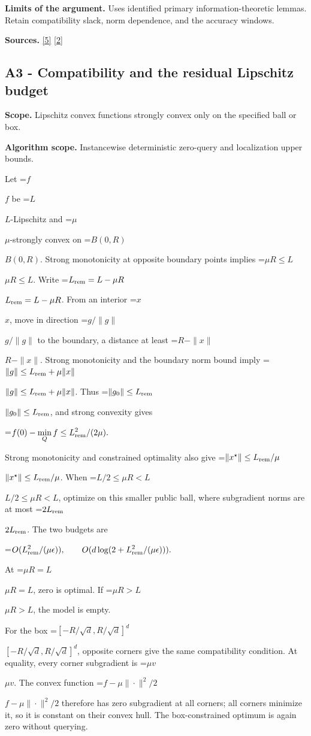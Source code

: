 \documentclass[10pt,a4paper]{article}
\newcommand{\AtlasMath}[1]{\par\begingroup\centering\setbox0=\hbox{$\displaystyle #1$}\ifdim\wd0>1.4\linewidth\typeout{ATLAS WIDE FORMULA: \the\wd0}\fi\ifdim\wd0>\linewidth\resizebox{\linewidth}{!}{\box0}\else\box0\fi\par\endgroup}
\newcommand{\AtlasInlineMath}[1]{\begingroup\setbox0=\hbox{$#1$}\ifdim\wd0>.4\linewidth\endgroup\AtlasMath{#1}\else\endgroup$#1$\fi}
\begin{document}
\textbf{Limits of the argument.} Uses identified primary information-theoretic lemmas. Retain compatibility slack, norm dependence, and the accuracy windows.

\textbf{Sources.} \href{https://arxiv.org/pdf/1407.5144}{[5]} \href{https://arxiv.org/pdf/1401.1792}{[2]}

\subsection{A3 - Compatibility and the residual Lipschitz budget}
\textbf{Scope.} Lipschitz convex functions strongly convex only on the specified ball or box.

\textbf{Algorithm scope.} Instancewise deterministic zero-query and localization upper bounds.

Let \AtlasInlineMath{f} be \AtlasInlineMath{L}-Lipschitz and \AtlasInlineMath{\mu}-strongly convex on \AtlasInlineMath{B(0,R)}. Strong monotonicity at opposite boundary points implies \AtlasInlineMath{\mu R\le L}. Write \AtlasInlineMath{L_{\rm rem}=L-\mu R}. From an interior \AtlasInlineMath{x}, move in direction \AtlasInlineMath{g/\|g\|} to the boundary, a distance at least \AtlasInlineMath{R-\|x\|}. Strong monotonicity and the boundary norm bound imply
\AtlasInlineMath{\|g\|\le L_{\rm rem}+\mu\|x\|}.
Thus \AtlasInlineMath{\|g_0\|\le L_{\rm rem}}, and strong convexity gives

\AtlasMath{f(0)-\min_Qf\le L_{\rm rem}^2/(2\mu).}

Strong monotonicity and constrained optimality also give \AtlasInlineMath{\|x^\star\|\le L_{\rm rem}/\mu}. When \AtlasInlineMath{L/2\le\mu R<L}, optimize on this smaller public ball, where subgradient norms are at most \AtlasInlineMath{2L_{\rm rem}}. The two budgets are

\AtlasMath{O(L_{\rm rem}^2/(\mu\epsilon)),\qquad
O(d\log(2+L_{\rm rem}^2/(\mu\epsilon))).}

At \AtlasInlineMath{\mu R=L}, zero is optimal. If \AtlasInlineMath{\mu R>L}, the model is empty.

For the box \AtlasInlineMath{[-R/\sqrt d,R/\sqrt d]^d}, opposite corners give the same compatibility condition. At equality, every corner subgradient is \AtlasInlineMath{\mu v}. The convex function \AtlasInlineMath{f-\mu\|\cdot\|^2/2} therefore has zero subgradient at all corners; all corners minimize it, so it is constant on their convex hull. The box-constrained optimum is again zero without querying.
\end{document}
